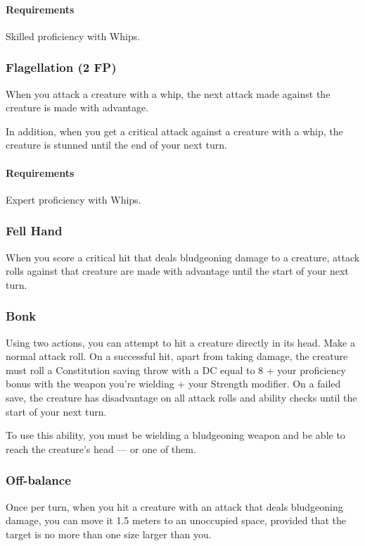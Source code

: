     \paragraph{Requirements} Skilled proficiency with Whips.
\subsubsection{Flagellation (2 FP)} \label{feat::flagellation}
    When you attack a creature with a whip, the next attack made against the creature is made with advantage.

    In addition, when you get a critical attack against a creature with a whip, the creature is stunned until the end of your next turn.
    \paragraph{Requirements} Expert proficiency with Whips.

\subsubsection{Fell Hand} \label{feat::fellhand}
    When you score a critical hit that deals bludgeoning damage to a creature, attack rolls against that creature are made with advantage until the start of your next turn.
\subsubsection{Bonk} \label{feat::bonk}
    Using two actions, you can attempt to hit a creature directly in its head.
    Make a normal attack roll.
    On a successful hit, apart from taking damage, the creature must roll a Constitution saving throw with a DC equal to 8 + your proficiency bonus with the weapon you're wielding + your Strength modifier.
    On a failed save, the creature has disadvantage on all attack rolls and ability checks until the start of your next turn.

    To use this ability, you must be wielding a bludgeoning weapon and be able to reach the creature's head --- or one of them.
\subsubsection{Off-balance} \label{feat::offbalance}
    Once per turn, when you hit a creature with an attack that deals bludgeoning damage, you can move it 1.5 meters to an unoccupied space, provided that the target is no more than one size larger than you.

